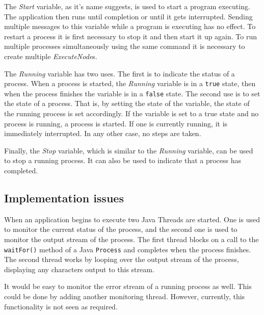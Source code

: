 \documentclass[10pt, notitlepage, a4paper]{article}
\begin{document}
The {\it Start} variable, as it's name suggests, is used to start a
program executing. The application then runs until completion or until
it gets interrupted. Sending multiple messages to this variable while a
program is executing has no effect. To restart a process it is first
necessary to stop it and then start it up again. To run multiple
processes simultaneously using the same command it is necessary to
create multiple {\it ExecuteNode}s. 

The {\it Running} variable has two uses. The first is to indicate the
status of a process. When a process is started, the {\it Running}
variable is in a {\tt true} state, then when the process finishes the
variable is in a {\tt false} state. The second use is to set the state
of a process. That is, by setting the state of the variable, the state
of the running process is set accordingly. If the variable is set to a
true state and no process is running, a process is started. If one is
currently running, it is immediately interrupted. In any other case, no
steps are taken.

Finally, the {\it Stop} variable, which is similar to the {\it Running}
variable, can be used to stop a running process. It can also be used to
indicate that a process has completed.

\subsection{Implementation issues}
When an application begins to execute two Java Threads are started. One is
used to monitor the current status of the process, and the second one is used to
monitor the output stream of the process. The first thread blocks on a call to
the {\tt waitFor()} method of a Java {\tt Process} and completes when the
process finishes. The second thread works by looping over the output stream of
the process, displaying any characters output to this stream.

It would be easy to monitor the error stream of a running process as well. This
could be done by adding another monitoring thread. However, currently, this
functionality is not seen as required.
\end{document}
